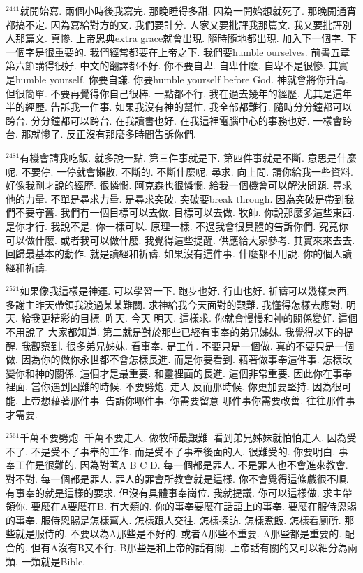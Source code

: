 \documentclass{book}
\begin{document}
$^{2441}$就開始寫.
兩個小時後我寫完.
那晚睡得多甜.
因為一開始想就死了.
那晚開通宵都搞不定.
因為寫給對方的文.
我們要計分.
人家又要批評我那篇文.
我又要批評別人那篇文.
真慘.
上帝恩典extra grace就會出現.
隨時隨地都出現.
加入下一個字.
下一個字是很重要的.
我們經常都要在上帝之下.
我們要humble ourselves.
前書五章第六節講得很好.
中文的翻譯都不好.
你不要自卑.
自卑什麼.
自卑不是很慘.
其實是humble yourself.
你要自謙.
你要humble yourself before God.
神就會將你升高.
但很簡單.
不要再覺得你自己很棒.
一點都不行.
我在過去幾年的經歷.
尤其是這年半的經歷.
告訴我一件事.
如果我沒有神的幫忙.
我全部都難行.
隨時分分鐘都可以跨台.
分分鐘都可以跨台.
在我讀書也好.
在我這裡電腦中心的事務也好.
一樣會跨台.
那就慘了.
反正沒有那麼多時間告訴你們.

$^{2481}$有機會請我吃飯.
就多說一點.
第三件事就是下.
第四件事就是不斷.
意思是什麼呢.
不要停.
一停就會懶散.
不斷的.
不斷什麼呢.
尋求.
向上問.
請你給我一些資料.
好像我剛才說的經歷.
很憐憫.
阿克森也很憐憫.
給我一個機會可以解決問題.
尋求他的力量.
不單是尋求力量.
是尋求突破.
突破要break through.
因為突破是帶到我們不要守舊.
我們有一個目標可以去做.
目標可以去做.
牧師.
你說那麼多這些東西.
是你才行.
我說不是.
你一樣可以.
原理一樣.
不過我會很具體的告訴你們.
究竟你可以做什麼.
或者我可以做什麼.
我覺得這些提醒.
供應給大家參考.
其實來來去去.
回歸最基本的動作.
就是讀經和祈禱.
如果沒有這件事.
什麼都不用說.
你的個人讀經和祈禱.

$^{2521}$如果像我這樣是神運.
可以學習一下.
跑步也好.
行山也好.
祈禱可以幾樣東西.
多謝主昨天帶領我渡過某某難關.
求神給我今天面對的艱難.
我懂得怎樣去應對.
明天.
給我更精彩的目標.
昨天.
今天 明天.
這樣求.
你就會慢慢和神的關係變好.
這個不用說了 大家都知道.
第二就是對於那些已經有事奉的弟兄姊妹.
我覺得以下的提醒.
我觀察到.
很多弟兄姊妹.
看事奉.
是工作.
不要只是一個做.
真的不要只是一個做.
因為你的做你永世都不會怎樣長進.
而是你要看到.
藉著做事奉這件事.
怎樣改變你和神的關係.
這個才是最重要.
和靈裡面的長進.
這個非常重要.
因此你在事奉裡面.
當你遇到困難的時候.
不要劈炮.
走人 反而那時候.
你更加要堅持.
因為很可能.
上帝想藉著那件事.
告訴你哪件事.
你需要留意 哪件事你需要改善.
往往那件事才需要.

$^{2561}$千萬不要劈炮.
千萬不要走人.
做牧師最艱難.
看到弟兄姊妹就怕怕走人.
因為受不了.
不是受不了事奉的工作.
而是受不了事奉後面的人.
很難受的.
你要明白.
事奉工作是很難的.
因為對著A B C D.
每一個都是罪人.
不是罪人也不會進來教會.
對不對.
每一個都是罪人.
罪人的罪會所教會就是這樣.
你不會覺得這條戲很不順.
有事奉的就是這樣的要求.
但沒有具體事奉崗位.
我就提議.
你可以這樣做.
求主帶領你.
要麼在A要麼在B.
有大類的.
你的事奉要麼在話語上的事奉.
要麼在服侍恩賜的事奉.
服侍恩賜是怎樣幫人.
怎樣跟人交往.
怎樣探訪.
怎樣煮飯.
怎樣看廁所.
那些就是服侍的.
不要以為A那些是不好的.
或者A那些不重要.
A那些都是重要的.
配合的.
但有A沒有B又不行.
B那些是和上帝的話有關.
上帝話有關的又可以細分為兩類.
一類就是Bible.
\end{document}
